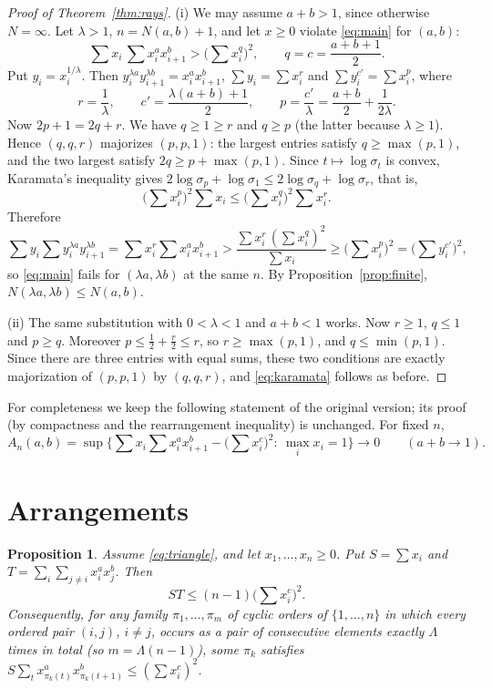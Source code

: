 \documentclass[11pt]{article}
\newtheorem{proposition}[theorem]{Proposition}
\theoremstyle{remark}
\numberwithin{equation}{section}
\begin{document}
\begin{proof}[Proof of Theorem~\ref{thm:rays}]
(i) We may assume $a+b>1$, since otherwise $N=\infty$. Let $\lambda>1$, $n=N(a,b)+1$, and let
$x\ge0$ violate \eqref{eq:main} for $(a,b)$:
\[
\textstyle\sum x_i\,\sum x_i^ax_{i+1}^b>\big(\sum x_i^q\big)^2,\qquad q=c=\frac{a+b+1}{2}.
\]
Put $y_i=x_i^{1/\lambda}$. Then $y_i^{\lambda a}y_{i+1}^{\lambda b}=x_i^ax_{i+1}^b$,
$\sum y_i=\sum x_i^{r}$ and $\sum y_i^{c'}=\sum x_i^{p}$, where
\[
r=\frac1\lambda,\qquad c'=\frac{\lambda(a+b)+1}{2},\qquad p=\frac{c'}{\lambda}=\frac{a+b}{2}+\frac{1}{2\lambda}.
\]
Now $2p+1=2q+r$. We have $q\ge1\ge r$ and $q\ge p$ (the latter because $\lambda\ge1$). Hence
$(q,q,r)$ majorizes $(p,p,1)$: the largest entries satisfy $q\ge\max(p,1)$, and the two largest
satisfy $2q\ge p+\max(p,1)$. Since $t\mapsto\log\sigma_t$ is convex, Karamata's inequality gives
$2\log\sigma_p+\log\sigma_1\le2\log\sigma_q+\log\sigma_r$, that is,
\begin{equation}\label{eq:karamata}
\Big(\sum x_i^p\Big)^2\sum x_i\le\Big(\sum x_i^q\Big)^2\sum x_i^r .
\end{equation}
Therefore
\[
\sum y_i\sum y_i^{\lambda a}y_{i+1}^{\lambda b}=\sum x_i^r\sum x_i^ax_{i+1}^b>\frac{\sum x_i^r\,(\sum x_i^q)^2}{\sum x_i}\ge\Big(\sum x_i^p\Big)^2=\Big(\sum y_i^{c'}\Big)^2,
\]
so \eqref{eq:main} fails for $(\lambda a,\lambda b)$ at the same $n$. By
Proposition~\ref{prop:finite}, $N(\lambda a,\lambda b)\le N(a,b)$.

(ii) The same substitution with $0<\lambda<1$ and $a+b<1$ works. Now $r\ge1$, $q\le1$ and
$p\ge q$. Moreover $p\le\frac12+\frac r2\le r$, so $r\ge\max(p,1)$, and
$q\le\min(p,1)$. Since there are three entries with equal sums, these two conditions are
exactly majorization of $(p,p,1)$ by $(q,q,r)$, and \eqref{eq:karamata} follows as before.
\end{proof}


For completeness we keep the following statement of the original version; its proof (by
compactness and the rearrangement inequality) is unchanged. For fixed $n$,
\[
A_n(a,b)=\sup\Big\{\sum x_i\sum x_i^ax_{i+1}^b-\Big(\sum x_i^c\Big)^2:\ \max_i x_i=1\Big\}\longrightarrow0\qquad(a+b\to1).
\]

\section{Arrangements}

\begin{proposition}\label{prop:arr}
Assume \eqref{eq:triangle}, and let $x_1,\dots,x_n\ge0$. Put $S=\sum x_i$ and
$T=\sum_i\sum_{j\ne i}x_i^ax_j^b$. Then
\begin{equation}\label{eq:ST}
ST\le (n-1)\Big(\sum x_i^c\Big)^2 .
\end{equation}
Consequently, for any family $\pi_1,\dots,\pi_m$ of cyclic orders of $\{1,\dots,n\}$ in
which every ordered pair $(i,j)$, $i\ne j$, occurs as a pair of consecutive elements exactly
$\Lambda$ times in total (so $m=\Lambda(n-1)$), some $\pi_k$ satisfies
$S\sum_tx_{\pi_k(t)}^ax_{\pi_k(t+1)}^b\le(\sum x_i^c)^2$.
\end{proposition}
\end{document}

